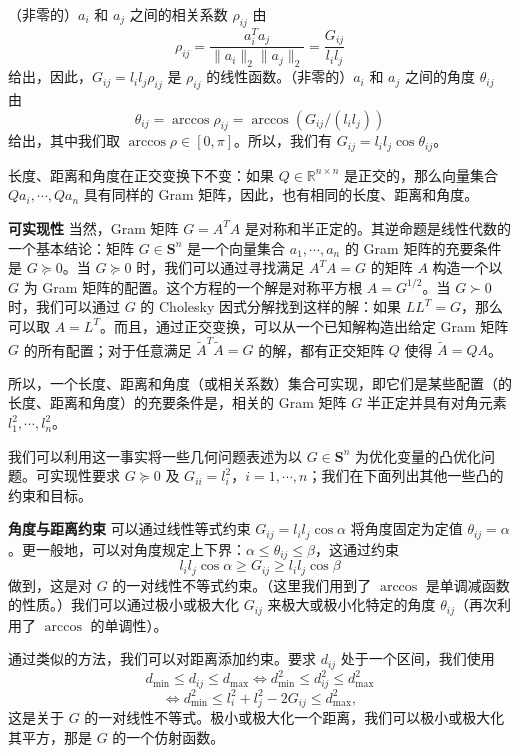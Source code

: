 \documentclass[UTF8,12pt,a4paper,fontset=fandol]{ctexart}
\begin{document}
（非零的）$a_i$ 和 $a_j$ 之间的相关系数 $\rho_{ij}$ 由
\[
\rho_{ij}=\frac{a_i^Ta_j}{\|a_i\|_2\|a_j\|_2}=\frac{G_{ij}}{l_il_j}
\]
给出，因此，$G_{ij}=l_il_j\rho_{ij}$ 是 $\rho_{ij}$ 的线性函数。（非零的）$a_i$ 和 $a_j$ 之间的角度 $\theta_{ij}$ 由
\[
\theta_{ij}=\arccos\rho_{ij}=\arccos(G_{ij}/(l_il_j))
\]
给出，其中我们取 $\arccos\rho\in[0,\pi]$。所以，我们有 $G_{ij}=l_il_j\cos\theta_{ij}$。

长度、距离和角度在正交变换下不变：如果 $Q\in\mathbb{R}^{n\times n}$ 是正交的，那么向量集合 $Qa_i,\cdots,Qa_n$ 具有同样的 Gram 矩阵，因此，也有相同的长度、距离和角度。

\noindent\textbf{可实现性}\quad
当然，Gram 矩阵 $G=A^TA$ 是对称和半正定的。其逆命题是线性代数的一个基本结论：矩阵 $G\in\mathbf{S}^n$ 是一个向量集合 $a_1,\cdots,a_n$ 的 Gram 矩阵的充要条件是 $G\succeq 0$。当 $G\succeq 0$ 时，我们可以通过寻找满足 $A^TA=G$ 的矩阵 $A$ 构造一个以 $G$ 为 Gram 矩阵的配置。这个方程的一个解是对称平方根 $A=G^{1/2}$。当 $G\succ 0$ 时，我们可以通过 $G$ 的 Cholesky 因式分解找到这样的解：如果 $LL^T=G$，那么可以取 $A=L^T$。而且，通过正交变换，可以从一个已知解构造出给定 Gram 矩阵 $G$ 的所有配置；对于任意满足 $\tilde{A}^T\tilde{A}=G$ 的解，都有正交矩阵 $Q$ 使得 $\tilde{A}=QA$。

所以，一个长度、距离和角度（或相关系数）集合可实现，即它们是某些配置（的长度、距离和角度）的充要条件是，相关的 Gram 矩阵 $G$ 半正定并具有对角元素 $l_1^2,\cdots,l_n^2$。

我们可以利用这一事实将一些几何问题表述为以 $G\in\mathbf{S}^n$ 为优化变量的凸优化问题。可实现性要求 $G\succeq 0$ 及 $G_{ii}=l_i^2$，$i=1,\cdots,n$；我们在下面列出其他一些凸的约束和目标。

\noindent\textbf{角度与距离约束}\quad
可以通过线性等式约束 $G_{ij}=l_il_j\cos\alpha$ 将角度固定为定值 $\theta_{ij}=\alpha$。更一般地，可以对角度规定上下界：$\alpha\leq\theta_{ij}\leq\beta$，这通过约束
\[
l_il_j\cos\alpha\geq G_{ij}\geq l_il_j\cos\beta
\]
做到，这是对 $G$ 的一对线性不等式约束。（这里我们用到了 $\arccos$ 是单调减函数的性质。）我们可以通过极小或极大化 $G_{ij}$ 来极大或极小化特定的角度 $\theta_{ij}$（再次利用了 $\arccos$ 的单调性）。

通过类似的方法，我们可以对距离添加约束。要求 $d_{ij}$ 处于一个区间，我们使用
\[
d_{\min}\leq d_{ij}\leq d_{\max}\Longleftrightarrow d_{\min}^2\leq d_{ij}^2\leq d_{\max}^2
\]
\[
\Longleftrightarrow d_{\min}^2\leq l_i^2+l_j^2-2G_{ij}\leq d_{\max}^2,
\]
这是关于 $G$ 的一对线性不等式。极小或极大化一个距离，我们可以极小或极大化其平方，那是 $G$ 的一个仿射函数。
\end{document}
